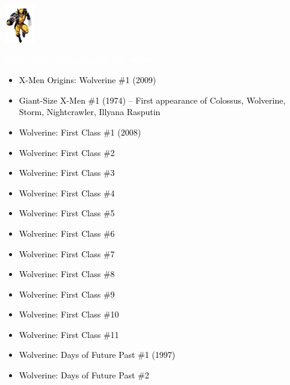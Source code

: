 \documentclass[12pt]{article}
\newcommand{\checkbox}{\raisebox{0.0ex}{\fbox{\rule{0ex}{1.5ex} \rule{1.5ex}{0ex}}}}
\begin{document}
\begin{center}
    \vspace*{2cm}
    \includegraphics[width=0.1\textwidth]{wolverine.png}
    \vspace{0.3cm}

    {\Huge \textbf{\textcolor{white}{Wolverine Chronological Checklist}}}
\end{center}

\vspace{0.3cm}
\noindent
\begin{tcolorbox}[
  colback=white!95!gray,
  colframe=black,
  width=\textwidth,
  arc=4mm,
  auto outer arc,
  boxrule=0.8pt,
  left=8pt,right=8pt,top=8pt,bottom=8pt
]
\begin{itemize}[left=0pt,label={\checkbox}]
  \item \textcolor{black}{X-Men Origins: Wolverine \#1 (2009)}
  \item \textcolor{black}{Giant-Size X-Men \#1 (1974) – First appearance of Colossus, Wolverine, Storm, Nightcrawler, Illyana Rasputin}
  \item \textcolor{black}{Wolverine: First Class \#1 (2008)}
  \item \textcolor{black}{Wolverine: First Class \#2}
  \item \textcolor{black}{Wolverine: First Class \#3}
  \item \textcolor{black}{Wolverine: First Class \#4}
  \item \textcolor{black}{Wolverine: First Class \#5}
  \item \textcolor{black}{Wolverine: First Class \#6}
  \item \textcolor{black}{Wolverine: First Class \#7}
  \item \textcolor{black}{Wolverine: First Class \#8}
  \item \textcolor{black}{Wolverine: First Class \#9}
  \item \textcolor{black}{Wolverine: First Class \#10}
  \item \textcolor{black}{Wolverine: First Class \#11}
  \item \textcolor{black}{Wolverine: Days of Future Past \#1 (1997)}
  \item \textcolor{black}{Wolverine: Days of Future Past \#2}
\end{itemize}
\end{tcolorbox}
\end{document}
